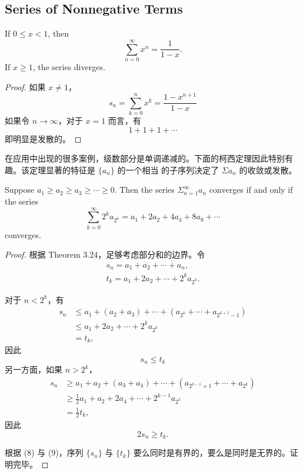 \documentclass[../poma-notes.tex]{subfiles}
\begin{document}
\subsection*{Series of Nonnegative Terms}

\begin{theorem}
  If $0 \le x < 1$, then
  \[ \sum_{n=0}^{\infty} x^n = \frac{1}{1-x}. \]
  If $x \ge 1$, the series diverges.
\end{theorem}

\begin{proof}
  如果 $x \ne 1$，
  \[ s_n = \sum_{k=0}^{n} x^k = \frac{1-x^{n+1}}{1-x} \]
  如果令 $n \to \infty$，对于 $x=1$ 而言，有
  \[ 1 + 1 + 1 + \cdots \]
  即明显是发散的。
\end{proof}

在应用中出现的很多案例，级数部分是单调递减的。下面的柯西定理因此特别有趣。该定理显著的特征是 $\{a_n\}$ 的一个相当  的子序列决定了 $\Sigma a_n$
的收敛或发散。

\begin{theorem}
  Suppose $a_1 \ge a_2 \ge a_3 \ge \cdots \ge 0$. Then the series $\Sigma_{n=1}^{\infty} a_n$ converges if and only if the series
  \begin{equation}
    \sum_{k=0}^{\infty} 2^k a_{2^k} = a_1 + 2a_2 + 4a_4 + 8a_8 + \cdots
  \end{equation}
  converges.
\end{theorem}

\begin{proof}
  根据 Theorem 3.24，足够考虑部分和的边界。令
  \begin{gather*}
    s_n = a_1 + a_2 + \cdots + a_n, \\
    t_k = a_1 + 2a_2 + \cdots + 2^k a_{2^k}.
  \end{gather*}

  对于 $n < 2^k$，有
  \begin{align*}
    \mathcal{} s_n & \le a_1 + (a_2 + a_3) + \cdots + (a_{2^k} + \cdots + a_{2^{k+1}-1}) \\
                   & \le a_1 + 2a_2 + \cdots + 2^k a_{2^k}                               \\
                   & = t_k,
  \end{align*}
  因此
  \begin{equation}
    s_n \le t_k
  \end{equation}
  另一方面，如果 $n > 2^k$，
  \begin{align*}
    \mathcal{} s_n & \ge a_1 + a_2 + (a_3 + a_4) + \cdots + (a_{2^{k-1}+1} + \cdots + a_{2^k}) \\
                   & \ge \frac{1}{2}a_1 + a_2 + 2a_4 + \cdots + 2^{k-1}a_{2^k}                 \\
                   & = \frac{1}{2} t_k,
  \end{align*}
  因此
  \begin{equation}
    2s_n \ge t_k.
  \end{equation}

  根据 (8) 与 (9)，序列 $\{s_n\}$ 与 $\{t_k\}$ 要么同时是有界的，要么是同时是无界的。证明完毕。
\end{proof}
\end{document}
